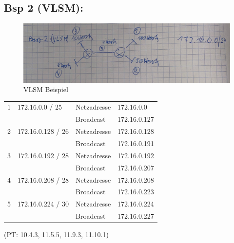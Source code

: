 \subsection*{Bsp 2 (VLSM):}
\begin{figure}[H]
	\centering
	\includegraphics[width=1.0\linewidth]{figures/bsp2_vlsm.jpeg}
	\caption{VLSM Beispiel}
\end{figure}
\begin{table}[H]
	\begin{tabular}{llll}
		1 & 172.16.0.0 / 25 & Netzadresse & 172.16.0.0 \\
		&  & Broadcast & 172.16.0.127 \\
		\hline
		2 & 172.16.0.128 / 26 & Netzadresse & 172.16.0.128 \\
		&  & Broadcast & 172.16.0.191 \\
		\hline
		3 & 172.16.0.192 / 28 & Netzadresse & 172.16.0.192 \\
		&  & Broadcast & 172.16.0.207 \\
		\hline
		4 & 172.16.0.208 / 28 & Netzadresse & 172.16.0.208 \\
		&  & Broadcast & 172.16.0.223 \\
		\hline
		5 & 172.16.0.224 / 30 & Netzadresse & 172.16.0.224 \\
		&  & Broadcast & 172.16.0.227
	\end{tabular}
\end{table}

(PT: 10.4.3, 11.5.5, 11.9.3, 11.10.1)






